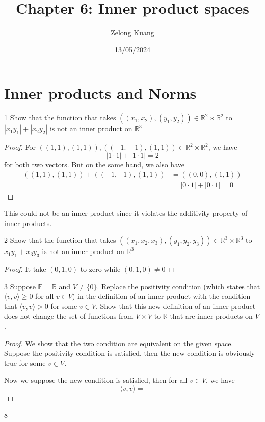 \documentclass{article}
\title{\vspace{-2em}Chapter 6: Inner product spaces}
\author{Zelong Kuang}
\date{13/05/2024}
\newenvironment{problem}[1]{\begin{prob*}{#1}{}}{\end{prob*}}
\begin{document}
\maketitle

\newpage
\tableofcontents
\newpage

\section{Inner products and Norms}
\begin{problem}{1}
Show that the function that takes $((x_1,x_2),(y_1,y_2)) \in \mathbb{R}^2 \times \mathbb{R}^2$
to $\left\vert x_1y_1 \right\vert + \left\vert x_2y_2 \right\vert$ is not an inner product on $\mathbb{R}^3$
\end{problem}
\begin{proof}
	For $((1,1), (1,1)), ((-1.-1), (1,1)) \in \mathbb{R}^2 \times \mathbb{R}^2$, we have \[
		\left\vert 1 \cdot 1 \right\vert + \left\vert 1 \cdot 1 \right\vert = 2 \]
	for both two vectors. But on the same hand, we also have
	\begin{align*}
		((1,1),(1,1)) + ((-1,-1),(1,1)) & = ((0,0),(1,1))                                                           \\
		                                & = \left\vert 0 \cdot 1 \right\vert + \left\vert 0 \cdot 1 \right\vert = 0
	\end{align*}
\end{proof}
This could not be an inner product since it violates
the additivity property of inner products.

\begin{problem}{2}
Show that the function that takes $((x_1,x_2,x_3),(y_1,y_2,y_3)) \in \mathbb{R}^{3} \times \mathbb{R}^3$
to $x_1y_1 + x_3y_3$ is not an inner product on $\mathbb{R}^3$
\end{problem}
\begin{proof}
	It take $(0,1,0)$ to zero while $(0,1,0) \neq 0$
\end{proof}

\begin{problem}{3}
Suppose $\mathbb{F} = \mathbb{R}$ and $V \neq \{0\}$. Replace the positivity condition
(which states that $\langle v, v \rangle \geq 0$ for all $v \in V$) in the definition
of an inner product with the condition that $\langle v, v \rangle > 0$
for some $v \in V$. Show that this new definition of an inner product
does not change the set of functions from $V \times V$ to $\mathbb{R}$
that are inner products on $V$.
\end{problem}
\begin{proof}
	We show that the two condition are equivalent on the given space.
	Suppose the positivity condition is satisfied, then the new condition
	is obviously true for some $v \in V$. \par
	Now we suppose the new condition is satisfied, then for all $v \in V$, we have \[
		\langle v, v \rangle = \]
\end{proof}
\begin{problem}{8}

\end{problem}

\end{document}
